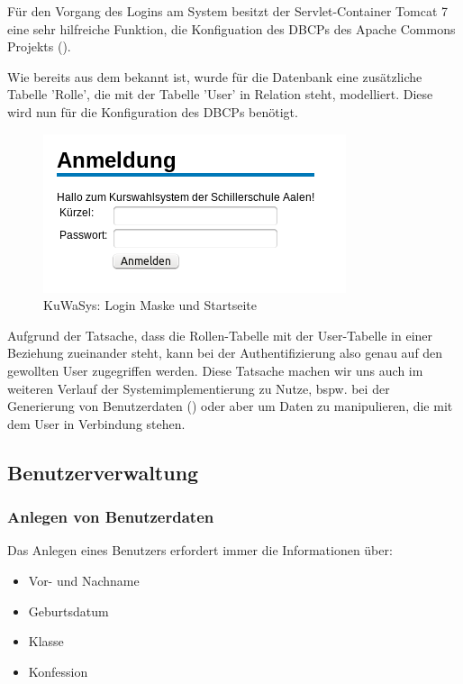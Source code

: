 Für den Vorgang des Logins am System besitzt der Servlet-Container Tomcat 7 eine sehr hilfreiche Funktion, die Konfiguation des \ac{DBCP}s des Apache Commons Projekts (\cite{tomcatDBCP}). 

Wie bereits aus dem  bekannt ist, wurde für die Datenbank eine zusätzliche Tabelle 'Rolle', die mit der Tabelle 'User' in Relation steht, modelliert. Diese wird nun für die Konfiguration des \ac{DBCP}s benötigt.

\begin{figure}
 \begin{center}
   \includegraphics[scale=0.7]{img/login_KuWaSys.png}
 \end{center}
 \caption[\textbf{KuWaSys: Login Maske und Startseite}]{KuWaSys: Login Maske und Startseite}
 \label{fig:login_KuWaSys}
\end{figure}

Aufgrund der Tatsache, dass die Rollen-Tabelle mit der User-Tabelle in einer Beziehung zueinander steht, kann bei der Authentifizierung also genau auf den gewollten User zugegriffen werden. Diese Tatsache machen wir uns auch im weiteren Verlauf der Systemimplementierung zu Nutze, bspw. bei der Generierung von Benutzerdaten () oder aber um Daten zu manipulieren, die mit dem User in Verbindung stehen.

\subsection{Benutzerverwaltung}\label{subsec:Daten eines Benutzers}

\subsubsection{Anlegen von Benutzerdaten}

Das Anlegen eines Benutzers erfordert immer die Informationen über:
\begin{itemize}
  \item Vor- und Nachname
  \item Geburtsdatum
  \item Klasse
  \item Konfession
\end{itemize}


